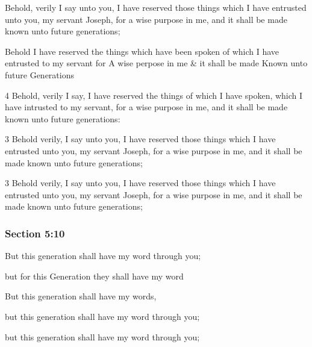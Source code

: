 		Behold, verily I say unto you, I have reserved those things which I have entrusted unto you, my servant Joseph, for a wise purpose in me, and it shall be made known unto future generations;

		\begin{framed}
		\scriptsize
			\begin{compactdesc}
				\item[JSP] Behold I have reserved the things which have been spoken of which I have entrusted to my servant for A wise perpose in me \& it shall be made Known unto future Generations
				\item[RB1] [\textit{missing}]
				\item[BC] 4 Behold, verily I say, I have reserved the things of which I have spoken, which I have intrusted to my servant, for a wise purpose in me, and it shall be made known unto future generations:
				\item[DC 1835] 3 Behold verily, I say unto you, I have reserved those things which I have entrusted unto you, my servant Joseph, for a wise purpose in me, and it shall be made known unto future generations;
				\item[DC 1844] 3 Behold verily, I say unto you, I have reserved those things which I have entrusted unto you, my servant Joseph, for a wise purpose in me, and it shall be made known unto future generations;
			\end{compactdesc}
		\end{framed}

	\subsubsection{Section 5:10} %
		\label{DC5-10}

		But this generation shall have my word through you;

		\begin{framed}
		\scriptsize
			\begin{compactdesc}
				\item[JSP] but for this Generation they shall have my word
				\item[RB1] [\textit{missing}]
				\item[BC] But this generation shall have my words,
				\item[DC 1835] but this generation shall have my word through you;
				\item[DC 1844] but this generation shall have my word through you;
			\end{compactdesc}
		\end{framed}

